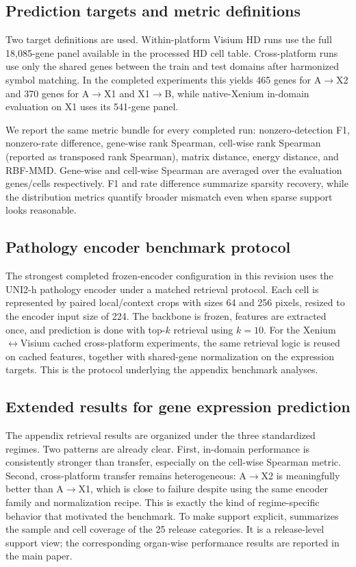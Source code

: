 \documentclass[sigconf,review]{acmart}
\begin{document}
\subsection{Prediction targets and metric definitions}
\label{sec:prediction_metrics}
Two target definitions are used. Within-platform Visium HD runs use the full 18,085-gene panel available in the processed HD cell table. Cross-platform runs use only the shared genes between the train and test domains after harmonized symbol matching. In the completed experiments this yields 465 genes for A$\!\rightarrow\!$X2 and 370 genes for A$\!\rightarrow\!$X1 and X1$\!\rightarrow\!$B, while native-Xenium in-domain evaluation on X1 uses its 541-gene panel.

We report the same metric bundle for every completed run: nonzero-detection F1, nonzero-rate difference, gene-wise rank Spearman, cell-wise rank Spearman (reported as transposed rank Spearman), matrix distance, energy distance, and RBF-MMD. Gene-wise and cell-wise Spearman are averaged over the evaluation genes/cells respectively. F1 and rate difference summarize sparsity recovery, while the distribution metrics quantify broader mismatch even when sparse support looks reasonable.

\subsection{Pathology encoder benchmark protocol}
\label{sec:encoder_protocol}
The strongest completed frozen-encoder configuration in this revision uses the UNI2-h pathology encoder under a matched retrieval protocol. Each cell is represented by paired local/context crops with sizes 64 and 256 pixels, resized to the encoder input size of 224. The backbone is frozen, features are extracted once, and prediction is done with top-$k$ retrieval using $k=10$. For the Xenium$\leftrightarrow$Visium cached cross-platform experiments, the same retrieval logic is reused on cached features, together with shared-gene normalization on the expression targets. This is the protocol underlying the appendix benchmark analyses.

\subsection{Extended results for gene expression prediction}
\label{sec:extended_prediction_results}
\noindent
The appendix retrieval results are organized under the three standardized regimes. Two patterns are already clear. First, in-domain performance is consistently stronger than transfer, especially on the cell-wise Spearman metric. Second, cross-platform transfer remains heterogeneous: A$\!\rightarrow\!$X2 is meaningfully better than A$\!\rightarrow\!$X1, which is close to failure despite using the same encoder family and normalization recipe. This is exactly the kind of regime-specific behavior that motivated the benchmark.
\noindent
To make support explicit,  summarizes the
sample and cell coverage of the 25 release categories. It is a release-level
support view; the corresponding organ-wise performance results are reported
in the main paper.
\end{document}
